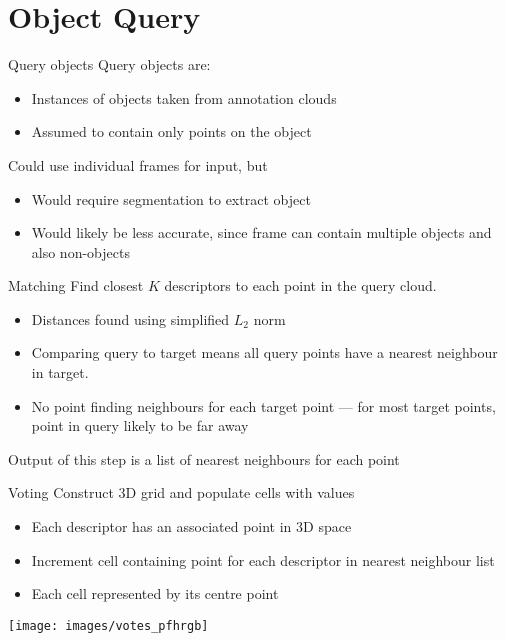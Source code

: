 \documentclass{beamer}
\begin{document}
\section{Object Query}
\begin{frame}{Query objects}
  Query objects are:
  \begin{itemize}
  \item Instances of objects taken from annotation clouds
  \item Assumed to contain only points on the object
  \end{itemize}
  Could use individual frames for input, but
  \begin{itemize}
  \item Would require segmentation to extract object
  \item Would likely be less accurate, since frame can contain multiple objects and also non-objects
  \end{itemize}
\end{frame}
\begin{frame}{Matching}
  Find closest $K$ descriptors to each point in the query cloud.
  \begin{itemize}
  \item Distances found using simplified $L_2$ norm
  \item Comparing query to target means all query points have a nearest neighbour in target.
  \item No point finding neighbours for each target point --- for most target
    points, point in query likely to be far away
  \end{itemize}
  Output of this step is a list of nearest neighbours for each point
\end{frame}
\begin{frame}{Voting}
  Construct 3D grid and populate cells with values
  \begin{itemize}
  \item Each descriptor has an associated point in 3D space
  \item Increment cell containing point for each descriptor in nearest neighbour
    list
  \item Each cell represented by its centre point
  \end{itemize}
\end{frame}
\begin{frame}
  \begin{center}
    \texttt{[image: images/votes\_pfhrgb]}
  \end{center}
\end{frame}
\end{document}
